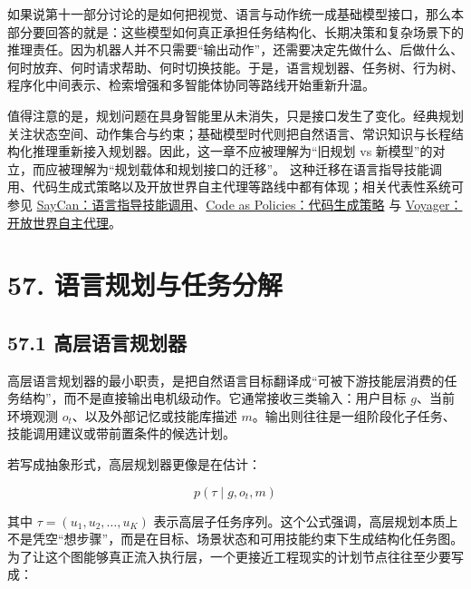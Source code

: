 

如果说第十一部分讨论的是如何把视觉、语言与动作统一成基础模型接口，那么本部分要回答的就是：这些模型如何真正承担任务结构化、长期决策和复杂场景下的推理责任。因为机器人并不只需要“输出动作”，还需要决定先做什么、后做什么、何时放弃、何时请求帮助、何时切换技能。于是，语言规划器、任务树、行为树、程序化中间表示、检索增强和多智能体协同等路线开始重新升温。

值得注意的是，规划问题在具身智能里从未消失，只是接口发生了变化。经典规划关注状态空间、动作集合与约束；基础模型时代则把自然语言、常识知识与长程结构化推理重新接入规划器。因此，这一章不应被理解为“旧规划 vs 新模型”的对立，而应被理解为“规划载体和规划接口的迁移”。 这种迁移在语言指导技能调用、代码生成式策略以及开放世界自主代理等路线中都有体现；相关代表性系统可参见 \href{https://arxiv.org/abs/2204.01691}{SayCan：语言指导技能调用}、\href{https://arxiv.org/abs/2209.07753}{Code as Policies：代码生成策略} 与 \href{https://arxiv.org/abs/2305.16291}{Voyager：开放世界自主代理}。

\section*{57. 语言规划与任务分解}

\subsection*{57.1 高层语言规划器}


高层语言规划器的最小职责，是把自然语言目标翻译成“可被下游技能层消费的任务结构”，而不是直接输出电机级动作。它通常接收三类输入：用户目标 \(g\)、当前环境观测 \(o_t\)、以及外部记忆或技能库描述 \(m\)。输出则往往是一组阶段化子任务、技能调用建议或带前置条件的候选计划。

若写成抽象形式，高层规划器更像是在估计：

\begin{equation*}
p(\tau \mid g, o_t, m)
\end{equation*}

其中 \(\tau = (u_1, u_2, \dots, u_K)\) 表示高层子任务序列。这个公式强调，高层规划本质上不是凭空“想步骤”，而是在目标、场景状态和可用技能约束下生成结构化任务图。为了让这个图能够真正流入执行层，一个更接近工程现实的计划节点往往至少要写成：

